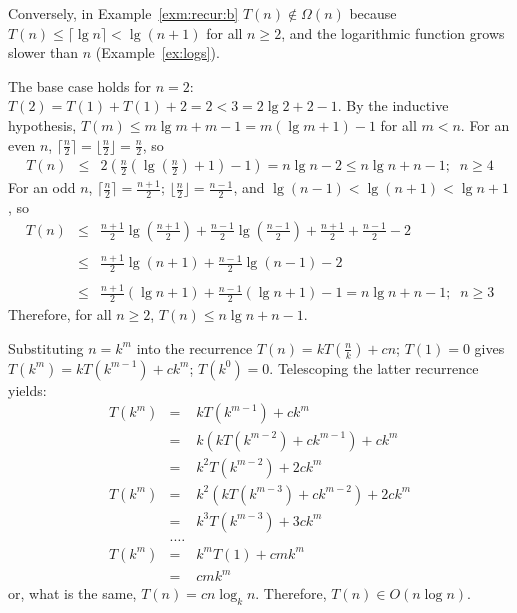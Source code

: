 Conversely, in Example~\ref{exm:recur:b} $T(n)\notin\Omega(n)$ because 
$T(n) \leq \lceil\lg n\rceil < \lg(n+1)$ for all $n\geq 2$, and the 
logarithmic function grows slower than $n$ (Example~\ref{ex:logs}).

The base case holds for $n=2$: $T(2)=T(1)+T(1)+2 = 2 < 3 = 2\lg2 + 2 -1$.
By the inductive hypothesis, $T(m) \leq m\lg m + m - 1 = m(\lg m + 1) - 1$ for all $m < n$.
For an even $n$, $\lceil \frac{n}{2} \rceil =  \lfloor \frac{n}{2}  \rfloor = \frac{n}{2}$,
so
\[
\begin{array}{lll}
T(n) & \leq & 2\left(\frac{n}{2}\left(\lg\left(\frac{n}{2}\right) + 1\right) - 1\right) = n\lg n - 2 \leq n\lg n + n - 1;\;\;n\geq 4
\end{array}
\]
For an odd $n$, $\lceil \frac{n}{2} \rceil = \frac{n+1}{2}$; 
$\lfloor \frac{n}{2}  \rfloor = \frac{n-1}{2}$, and $\lg(n-1) < \lg(n+1) < \lg n + 1$, so
\[
\begin{array}{lll}
T(n)& \leq & \frac{n+1}{2}\lg\left(\frac{n+1}{2}\right) + \frac{n-1}{2}\lg\left( \frac{n-1}{2}\right) + \frac{n+1}{2} + \frac{n-1}{2} - 2 \\ \\
& \leq & \frac{n+1}{2}\lg(n+1) + \frac{n-1}{2}\lg(n-1) - 2 \\ \\
& \leq  & \frac{n+1}{2} \left(\lg n + 1\right) + \frac{n-1}{2} \left(\lg n + 1 \right) - 1 = n\lg n + n - 1; \; \; n \geq 3
\end{array}
\]
Therefore, for all $n \geq 2$, $T(n) \leq n\lg n + n - 1$.

Substituting \(n=k^m\) into the recurrence 
\(T(n) =kT\left(\frac{n}{k}\right)+cn\); \(T(1)=0\) gives
\( T(k^m) = kT(k^{m-1})+ck^m\); \(T(k^0)=0\). Telescoping the latter recurrence yields:
\begin{eqnarray*}
T(k^m) &=& kT(k^{m-1}) + ck^m \\
             &=& k\left(kT(k^{m-2})+ ck^{m-1}\right) + ck^m\\ 
             &=&k^2T(k^{m-2}) + 2ck^m \\
T(k^m) &=& k^2\left(kT(k^{m-3})+ck^{m-2}\right) + 2ck^m\\
             &=& k^3T(k^{m-3}) + 3ck^m\\
             &.\ldots& \\
T(k^m) &=& k^mT(1) + cmk^m \\
              &=& cmk^m 
\end{eqnarray*}
or, what is the same, $T(n) = cn\log_k{n}$.
Therefore, \(T(n) \in O(n\log{n})\).


